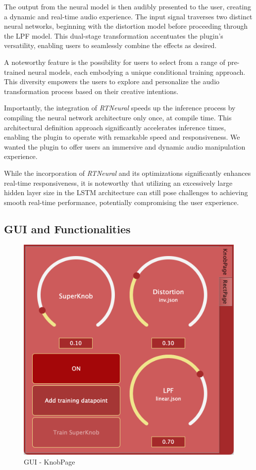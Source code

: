 \documentclass{article}
\begin{document}
\begin{sloppy}
The output from the neural model is then audibly presented to the user, creating a dynamic and real-time audio experience. The input signal traverses two distinct neural networks, beginning with the distortion model before proceeding through the LPF model. This dual-stage transformation accentuates the plugin's versatility, enabling users to seamlessly combine the effects as desired.

A noteworthy feature is the possibility for users to select from a range of pre-trained neural models, each embodying a unique conditional training approach. This diversity empowers the users to explore and personalize the audio transformation process based on their creative intentions.

Importantly, the integration of \emph{RTNeural} speeds up the inference process by compiling the neural network architecture only once, at compile time. This architectural definition approach significantly accelerates inference times, enabling the plugin to operate with remarkable speed and responsiveness. We wanted the plugin to offer users an immersive and dynamic audio manipulation experience.

While the incorporation of \emph{RTNeural} and its optimizations significantly enhances real-time responsiveness, it is noteworthy that utilizing an excessively large hidden layer size in the LSTM architecture can still pose challenges to achieving smooth real-time performance, potentially compromising the user experience.

\subsection{GUI and Functionalities}
\label{ssec:gui}

\begin{figure}[t]
  \centering
  \centerline{\includegraphics[width=\columnwidth]{images/knobPage.png}}
  \caption{GUI - KnobPage}
  \label{fig:knobPage}
\end{figure}


\end{sloppy}
\end{document}
